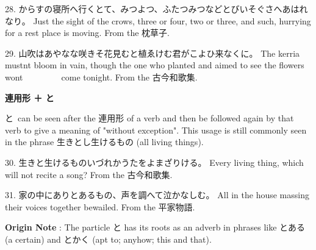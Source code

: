 \par{28. からすの寝所へ行くとて、みつよつ、ふたつみつなどとびいそぐさへあはれなり。 \hfill\break
Just the sight of the crows, three or four, two or three, and such, hurrying for a rest place is moving. \hfill\break
From the 枕草子. }

\par{29. 山吹はあやなな咲きそ花見むと植ゑけむ君がこよひ来なくに。 \hfill\break
The kerria mustn\textquotesingle t bloom in vain, though the one who planted and aimed to see the flowers won\textquotesingle t           come tonight. \hfill\break
From the 古今和歌集. }

\begin{center}
 \textbf{連用形 ＋ と }
\end{center}

\par{ と can be seen after the 連用形 of a verb and then be followed again by that verb to give a meaning of "without exception". This usage is still commonly seen in the phrase 生きとし生けるもの (all living things). }

\par{30. 生きと生けるものいづれかうたをよまざりける。 \hfill\break
Every living thing, which will not recite a song? \hfill\break
From the 古今和歌集. }

\par{31. 家の中にありとあるもの、声を調へて泣かなしむ。 \hfill\break
All in the house massing their voices together bewailed. \hfill\break
From the 平家物語. }

\par{\textbf{Origin Note }: The particle と has its roots as an adverb in phrases like とある (a certain) and とかく (apt to; anyhow; this and that). }
    